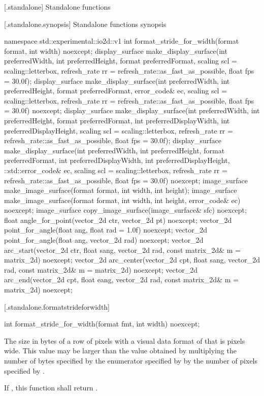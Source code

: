  [\iotwod.standalone] {Standalone functions}

 [\iotwod.standalone.synopsis] {Standalone functions synopsis}

\begin{codeblock}
namespace std::experimental::io2d::v1 {
  int format_stride_for_width(format format, int width) noexcept;
  display_surface make_display_surface(int preferredWidth,
    int preferredHeight, format preferredFormat,
    scaling scl = scaling::letterbox,
    refresh_rate rr = refresh_rate::as_fast_as_possible, float fps = 30.0f);
  display_surface make_display_surface(int preferredWidth,
    int preferredHeight, format preferredFormat, error_code& ec,
    scaling scl = scaling::letterbox,
    refresh_rate rr = refresh_rate::as_fast_as_possible, float fps = 30.0f) noexcept;
  display_surface make_display_surface(int preferredWidth,
    int preferredHeight, format preferredFormat, int preferredDisplayWidth, 
    int preferredDisplayHeight, scaling scl = scaling::letterbox,
    refresh_rate rr = refresh_rate::as_fast_as_possible, float fps = 30.0f);
  display_surface make_display_surface(int preferredWidth,
    int preferredHeight, format preferredFormat, int preferredDisplayWidth, 
    int preferredDisplayHeight, ::std::error_code& ec,
    scaling scl = scaling::letterbox,
    refresh_rate rr = refresh_rate::as_fast_as_possible, float fps = 30.0f) noexcept;
  image_surface make_image_surface(format format, int width, int height);
  image_surface make_image_surface(format format, int width, int height, 
    error_code& ec) noexcept;
  image_surface copy_image_surface(image_surface& sfc) noexcept;
  float angle_for_point(vector_2d ctr, vector_2d pt) noexcept;
  vector_2d point_for_angle(float ang, float rad = 1.0f) noexcept;
  vector_2d point_for_angle(float ang, vector_2d rad) noexcept;
  vector_2d arc_start(vector_2d ctr, float sang, vector_2d rad, 
    const matrix_2d& m = matrix_2d{}) noexcept;
  vector_2d arc_center(vector_2d cpt, float sang, vector_2d rad, 
    const matrix_2d& m = matrix_2d{}) noexcept;
  vector_2d arc_end(vector_2d cpt, float eang, vector_2d rad, 
    const matrix_2d& m = matrix_2d{}) noexcept;
}
\end{codeblock}

 [\iotwod.standalone.formatstrideforwidth] {}

%
\begin{itemdecl}
int format_stride_for_width(format fmt, int width) noexcept;
\end{itemdecl}
\begin{itemdescr}
\pnum
\returns
The size in bytes of a row of pixels with a visual data format of  that is  pixels wide. This value may be larger than the value obtained by multiplying the number of bytes specified by the  enumerator specified by  by the number of pixels specified by .

\pnum
If , this function shall return .
\end{itemdescr}

